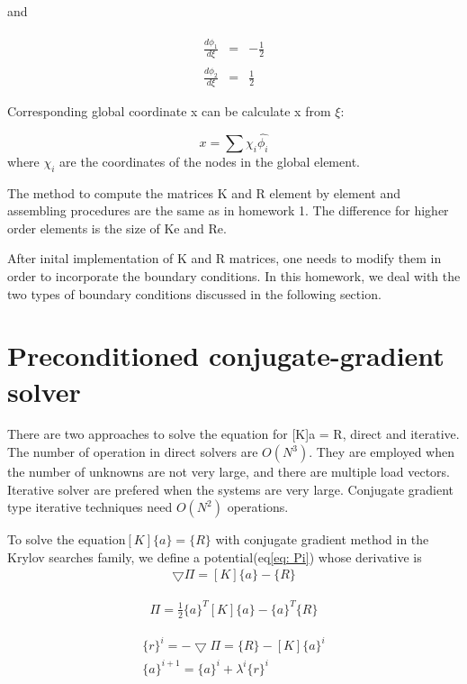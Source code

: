 \documentclass[paper=a4, fontsize=11pt]{article} %
\begin{document}
and

\begin{eqnarray}
\frac{d\hat{\phi_1}}{d\xi} &=& -\frac{1}{2}\nonumber\\
\frac{d\hat{\phi_2}}{d\xi} &=& \frac{1}{2}
\end{eqnarray}

Corresponding global coordinate x can be calculate x from $\xi$:

\begin{equation}
x = \sum{\chi _i \hat{\phi _i}}
\end{equation} 
where $\chi_i$ are the coordinates of the nodes in the global element. 

The method to compute the matrices K and R element by element and assembling procedures are the same as in homework 1. The difference for higher order elements is the size of Ke and Re.   

 After inital implementation of K and R matrices, one needs to modify them in order to incorporate the boundary conditions. In this homework, we deal with the two types of boundary conditions discussed in the following section.


\section{Preconditioned conjugate-gradient solver}
There are two approaches to solve the equation for [K]{a} = {R}, direct and iterative. The number of operation in direct solvers are  $O(N^3)$. They are employed when the number of unknowns are not very large, and there are multiple load vectors. Iterative solver are prefered when the systems are very large. Conjugate gradient type iterative techniques need $O(N^2)$ operations. 

To solve the equation$[K]\{a\}=\{R\}$ with conjugate gradient method in the Krylov searches family, we define a potential(eq\ref{eq: Pi}) whose derivative is 
\begin{eqnarray}
\bigtriangledown \Pi = [K]\{a\} - \{R\}
\end{eqnarray}

\begin{eqnarray}
\label{eq: Pi}
\Pi = \frac{1}{2} \{a\}^T [K] \{a\} - \{a\}^T\{R\}
\end{eqnarray}

\begin{eqnarray}
\label{eq: residual}
\{r\}^i = - \bigtriangledown \Pi = \{R\} - [K] \{a\}^i \nonumber\\
\{a\}^{i+1} = \{a\}^i + \lambda^i \{r\}^i
\end{eqnarray}
\end{document}
